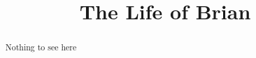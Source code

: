 
%

\title{The Life of Brian}



\maketitle

\begin{abstract}
    Nothing to see here
\end{abstract}

% 
% 

\printbibliography{}


